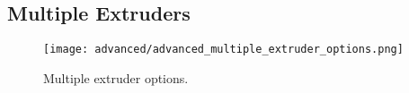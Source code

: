 
\subsection{Multiple Extruders} %
\label{sec:multiple_extruders}


\begin{figure}[H]
\centering
\texttt{[image: advanced/advanced\_multiple\_extruder\_options.png]}
\caption{Multiple extruder options.}
\label{fig:advanced_multiple_extruder_options}
\end{figure}


